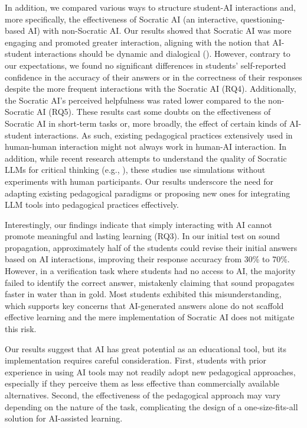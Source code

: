 \documentclass[
  12pt,
]{article}
\begin{document}
In addition, we compared various ways to structure student-AI interactions and, more specifically, the effectiveness of Socratic AI (an interactive, questioning-based AI) with non-Socratic AI. Our results showed that Socratic AI was more engaging and promoted greater interaction, aligning with the notion that AI-student interactions should be dynamic and dialogical (). However, contrary to our expectations, we found no significant differences in students' self-reported confidence in the accuracy of their answers or in the correctness of their responses despite the more frequent interactions with the Socratic AI (RQ4). Additionally, the Socratic AI's perceived helpfulness was rated lower compared to the non-Socratic AI (RQ5). These results cast some doubts on the effectiveness of Socratic AI in short-term tasks or, more broadly, the effect of certain kinds of AI-student interactions. As such, existing pedagogical practices extensively used in human-human interaction might not always work in human-AI interaction. In addition, while recent research attempts to understand the quality of Socratic LLMs for critical thinking (e.g., ), these studies use simulations without experiments with human participants. Our results underscore the need for adapting existing pedagogical paradigms or proposing new ones for integrating LLM tools into pedagogical practices effectively.

Interestingly, our findings indicate that simply interacting with AI cannot promote meaningful and lasting learning (RQ3). In our initial test on sound propagation, approximately half of the students could revise their initial answers based on AI interactions, improving their response accuracy from 30\% to 70\%. However, in a verification task where students had no access to AI, the majority failed to identify the correct answer, mistakenly claiming that sound propagates faster in water than in gold. Most students exhibited this misunderstanding, which supports key concerns that AI-generated answers alone do not scaffold effective learning and the mere implementation of Socratic AI does not mitigate this risk.

Our results suggest that AI has great potential as an educational tool, but its implementation requires careful consideration. First, students with prior experience in using AI tools may not readily adopt new pedagogical approaches, especially if they perceive them as less effective than commercially available alternatives. Second, the effectiveness of the pedagogical approach may vary depending on the nature of the task, complicating the design of a one-size-fits-all solution for AI-assisted learning.
\end{document}
